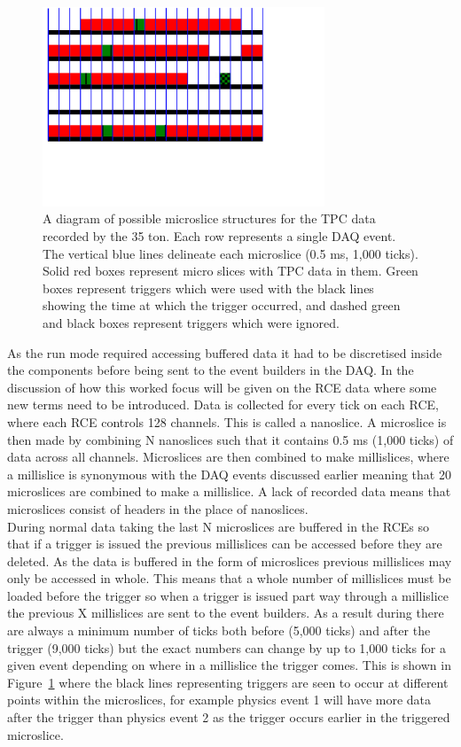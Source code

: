 \begin{figure}[h!]
  \centering
  \includegraphics[width=0.75\textwidth]{DataStructure}
  \caption[The 35 ton data structure]{A diagram of possible microslice structures for the TPC data recorded by the 35 ton. Each row represents a single DAQ event. The vertical blue lines delineate each microslice (0.5 ms, 1,000 ticks). Solid red boxes represent micro slices with TPC data in them. Green boxes represent triggers which were used with the black lines showing the time at which the trigger occurred, and dashed green and black boxes represent triggers which were ignored.}
  \label{fig:DataStructure}
\end{figure}

As the run mode required accessing buffered data it had to be discretised inside the components before being sent to the event builders in the DAQ. In the discussion of how this worked focus will be given on the RCE data where some new terms need to be introduced. Data is collected for every tick on each RCE, where each RCE controls 128 channels. This is called a nanoslice. A microslice is then made by combining N nanoslices such that it contains 0.5 ms (1,000 ticks) of data across all channels. Microslices are then combined to make millislices, where a millislice is synonymous with the DAQ events discussed earlier meaning that 20 microslices are combined to make a millislice. A lack of recorded data means that microslices consist of headers in the place of nanoslices. \\

During normal data taking the last N microslices are buffered in the RCEs so that if a trigger is issued the previous millislices can be accessed before they are deleted. As the data is buffered in the form of microslices previous millislices may only be accessed in whole. This means that a whole number of millislices must be loaded before the trigger so when a trigger is issued part way through a millislice the previous X millislices are sent to the event builders. As a result during there are always a minimum number of ticks both before (5,000 ticks) and after the trigger (9,000 ticks) but the exact numbers can change by up to 1,000 ticks for a given event depending on where in a millislice the trigger comes. This is shown in Figure~\ref{fig:DataStructure} where the black lines representing triggers are seen to occur at different points within the microslices, for example physics event 1 will have more data after the trigger than physics event 2 as the trigger occurs earlier in the triggered microslice. \\


